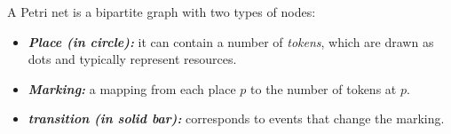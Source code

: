 \documentclass[landscape,final,a0paper,fontscale=0.285]{baposter}
\begin{document}
\begin{poster}
{A Petri net is a bipartite graph with two types of nodes: 
\begin{itemize}
   \item {\bf \emph{Place (in circle):}} it can contain a 
number of \emph{tokens}, which are drawn as dots and typically represent resources.
   \item {\bf \emph{Marking:}} a mapping from each place $p$ to the number of tokens at $p$.
   \item {\bf \emph{transition (in solid bar):}} corresponds to events that change the marking.
\end{itemize}
   \vspace{0.3em}
  }

\end{poster}
\end{document}
